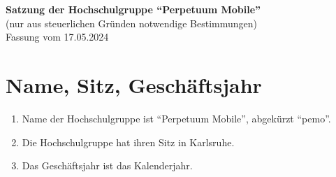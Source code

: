 \documentclass[11pt]{article}
\begin{document}
	\begin{center}
		\Large
		\textbf{
			Satzung der Hochschulgruppe ``Perpetuum Mobile''}\\
		\normalsize
		(nur aus steuerlichen Gründen notwendige Bestimmungen)\\
		\vspace{10mm}
		Fassung vom 17.05.2024
		\vspace{10mm}
	\end{center}

	\section{Name, Sitz, Geschäftsjahr}
	\begin{enumerate}
		\item Name der Hochschulgruppe ist ``Perpetuum Mobile'', abgekürzt ``pemo''.
		\item Die Hochschulgruppe hat ihren Sitz in Karlsruhe.
		\item Das Geschäftsjahr ist das Kalenderjahr.
	\end{enumerate}
\end{document}
